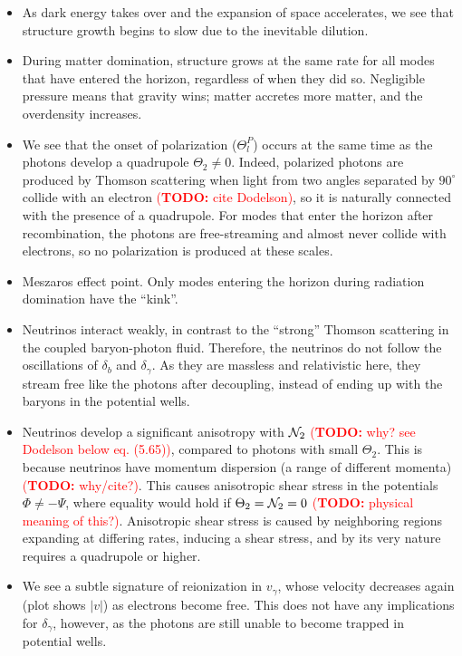 \documentclass[10pt,a4paper]{article}
\newcommand\TODO[1]{\textcolor{red}{(\textbf{TODO:} #1)}}
\begin{document}
\begin{itemize}
\item
As dark energy takes over and the expansion of space accelerates,
we see that structure growth begins to slow due to the inevitable dilution.

\item
During matter domination,
structure grows at the same rate for all modes that have entered the horizon,
regardless of when they did so.
Negligible pressure means that gravity wins; matter accretes more matter, and the overdensity increases.

\item
We see that the onset of polarization ($\Theta^P_l$) occurs at the same time as the photons develop a quadrupole $\Theta_2 \neq 0$.
Indeed, polarized photons are produced by Thomson scattering when light from two angles separated by $90^\circ$ collide with an electron \TODO{cite Dodelson},
so it is naturally connected with the presence of a quadrupole.
For modes that enter the horizon after recombination,
the photons are free-streaming and almost never collide with electrons,
so no polarization is produced at these scales.

\item
Meszaros effect point.
Only modes entering the horizon during radiation domination have the ``kink''.

\item
Neutrinos interact weakly, in contrast to the ``strong'' Thomson scattering in the coupled baryon-photon fluid.
Therefore, the neutrinos do not follow the oscillations of $\delta_b$ and $\delta_\gamma$.
As they are massless and relativistic here, they stream free like the photons after decoupling,
instead of ending up with the baryons in the potential wells.

\item
Neutrinos develop a significant anisotropy with $\mathcal{N}_2$ \TODO{why? see Dodelson below eq. (5.65)}, compared to photons with small $\Theta_2$.
This is because neutrinos have momentum dispersion (a range of different momenta) \TODO{why/cite?}.
This causes anisotropic shear stress in the potentials $\Phi \neq -\Psi$,
where equality would hold if $\Theta_2=\mathcal{N}_2=0$ \TODO{physical meaning of this?}.
Anisotropic shear stress is caused by neighboring regions expanding at differing rates,
inducing a shear stress,
and by its very nature requires a quadrupole or higher.

\item
We see a subtle signature of reionization in $v_\gamma$,
whose velocity decreases again (plot shows $|v|$) as electrons become free.
This does not have any implications for $\delta_\gamma$, however,
as the photons are still unable to become trapped in potential wells.


\end{itemize}
\end{document}
